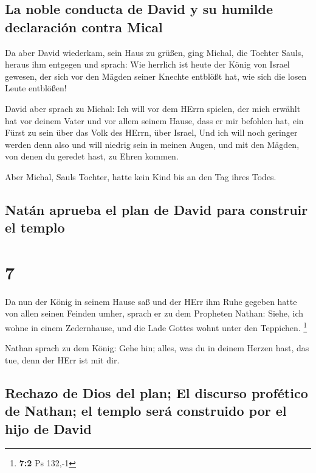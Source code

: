 \hypertarget{la-noble-conducta-de-david-y-su-humilde-declaraciuxf3n-contra-mical}{%
\subsection{La noble conducta de David y su humilde declaración contra
Mical}\label{la-noble-conducta-de-david-y-su-humilde-declaraciuxf3n-contra-mical}}

 Da aber David wiederkam, sein Haus zu grüßen, ging
Michal, die Tochter Sauls, heraus ihm entgegen und sprach: Wie herrlich
ist heute der König von Israel gewesen, der sich vor den Mägden seiner
Knechte entblößt hat, wie sich die losen Leute entblößen!

 David aber sprach zu Michal: Ich will vor dem HErrn
spielen, der mich erwählt hat vor deinem Vater und vor allem seinem
Hause, dass er mir befohlen hat, ein Fürst zu sein über das Volk des
HErrn, über Israel,  Und ich will noch geringer werden
denn also und will niedrig sein in meinen Augen, und mit den Mägden, von
denen du geredet hast, zu Ehren kommen.

 Aber Michal, Sauls Tochter, hatte kein Kind bis an den
Tag ihres Todes.

\hypertarget{natuxe1n-aprueba-el-plan-de-david-para-construir-el-templo}{%
\subsection{Natán aprueba el plan de David para construir el
templo}\label{natuxe1n-aprueba-el-plan-de-david-para-construir-el-templo}}

\hypertarget{section-6}{%
\section{7}\label{section-6}}

 Da nun der König in seinem Hause saß und der HErr ihm
Ruhe gegeben hatte von allen seinen Feinden umher,  sprach
er zu dem Propheten Nathan: Siehe, ich wohne in einem Zedernhause, und
die Lade Gottes wohnt unter den Teppichen. \footnote{\textbf{7:2} Ps
  132,-1}

 Nathan sprach zu dem König: Gehe hin; alles, was du in
deinem Herzen hast, das tue, denn der HErr ist mit dir.

\hypertarget{rechazo-de-dios-del-plan-el-discurso-profuxe9tico-de-nathan-el-templo-seruxe1-construido-por-el-hijo-de-david}{%
\subsection{Rechazo de Dios del plan; El discurso profético de Nathan;
el templo será construido por el hijo de
David}\label{rechazo-de-dios-del-plan-el-discurso-profuxe9tico-de-nathan-el-templo-seruxe1-construido-por-el-hijo-de-david}}

